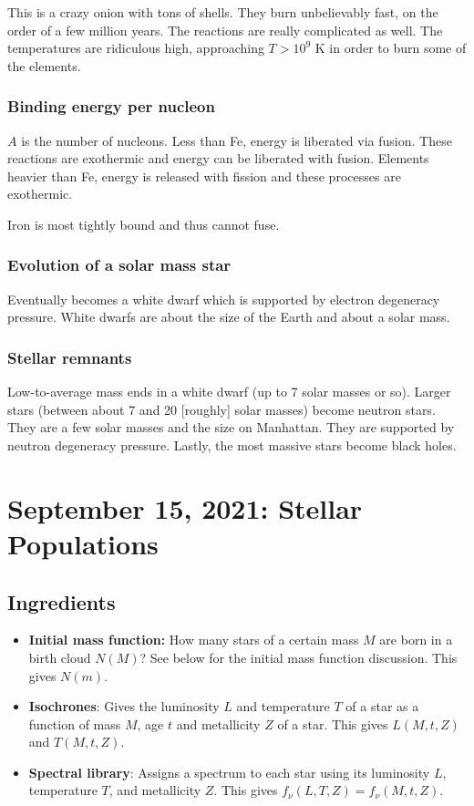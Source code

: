 \documentclass{article}
\begin{document}
This is a crazy onion with tons of shells. They burn unbelievably fast, on the order of a few million years. The reactions are really complicated as well. The temperatures are ridiculous high, approaching $T > 10^{9}$ K in order to burn some of the elements. 

\subsubsection{Binding energy per nucleon}

$A$ is the number of nucleons. Less than Fe, energy is liberated via fusion. These reactions are exothermic and energy can be liberated with fusion. Elements heavier than Fe, energy is released with fission and these processes are exothermic.

Iron is most tightly bound and thus cannot fuse. 

\subsubsection{Evolution of a solar mass star}

Eventually becomes a white dwarf which is supported by electron degeneracy pressure. White dwarfs are about the size of the Earth and about a solar mass. 

\subsubsection{Stellar remnants}

Low-to-average mass ends in a white dwarf (up to 7 solar masses or so). Larger stars (between about 7 and 20 [roughly] solar masses) become neutron stars. They are a few solar masses and the size on Manhattan. They are supported by neutron degeneracy pressure. Lastly, the most massive stars become black holes. 

\section{September 15, 2021: Stellar Populations}

\subsection{Ingredients}

\begin{itemize}
    \item \textbf{Initial mass function:} How many stars of a certain mass $M$ are born in a birth cloud $N(M)$? See below for the initial mass function discussion. This gives $N(m)$.
    
    \item \textbf{Isochrones}: Gives the luminosity $L$ and temperature $T$ of a star as a function of mass $M$, age $t$ and metallicity $Z$ of a star. This gives $L(M,t,Z)$ and $T(M,t,Z)$. 
    
    \item \textbf{Spectral library}: Assigns a spectrum to each star using its luminosity $L$, temperature $T$, and metallicity $Z$. This gives $f_\nu(L,T,Z)=f_\nu(M,t,Z)$.
\end{itemize}
\end{document}
